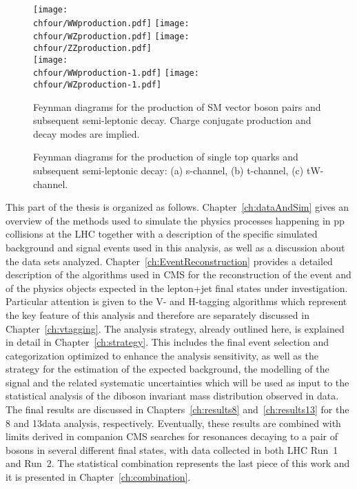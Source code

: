 \begin{figure}[!htb]
\centering
\texttt{[image: \\chfour/WWproduction.pdf]}
\texttt{[image: \\chfour/WZproduction.pdf]}
\texttt{[image: \\chfour/ZZproduction.pdf]}\\
\texttt{[image: \\chfour/WWproduction-1.pdf]}
\texttt{[image: \\chfour/WZproduction-1.pdf]}
\caption{Feynman diagrams for the production of SM vector boson pairs and subsequent semi-leptonic decay. Charge conjugate production and decay modes are implied.}
\label{fig:FDbkgVV}
\end{figure}

\begin{figure}[!htb]
\centering
{}
\caption{Feynman diagrams for the production of single top quarks and subsequent semi-leptonic decay: (a) s-channel, (b) t-channel, (c) tW-channel.}
\label{fig:FDbkgStop}
\end{figure}
   
This part of the thesis is organized as follows.
Chapter~\ref{ch:dataAndSim} gives an overview of the methods used to simulate the physics processes happening in pp collisions at the LHC
together with a description of the specific simulated background and signal events used in this analysis, as well as a discussion about the data sets analyzed.
Chapter~\ref{ch:EventReconstruction} provides a detailed description of the algorithms used in CMS for the reconstruction of the event and of the physics objects expected in the lepton+jet final states under investigation.
Particular attention is given to the V- and H-tagging algorithms which represent the key feature of this analysis and therefore are separately discussed in Chapter~\ref{ch:vtagging}.
The analysis strategy, already outlined here, is explained in detail in Chapter~\ref{ch:strategy}.
This includes the final event selection and categorization optimized to enhance the analysis sensitivity,
as well as the strategy for the estimation of the expected background, the modelling of the signal and the related systematic uncertainties
which will be used as input to the statistical analysis of the diboson invariant mass distribution observed in data.
The final results are discussed in Chapters~\ref{ch:results8} and~\ref{ch:results13} for the 8 and 13\TeV data analysis, respectively. 
Eventually, these results are combined with limits derived in companion CMS searches for resonances decaying to a pair of bosons in several different final states, with data collected in both LHC Run~1 and Run~2.
The statistical combination represents the last piece of this work and it is presented in Chapter~\ref{ch:combination}.